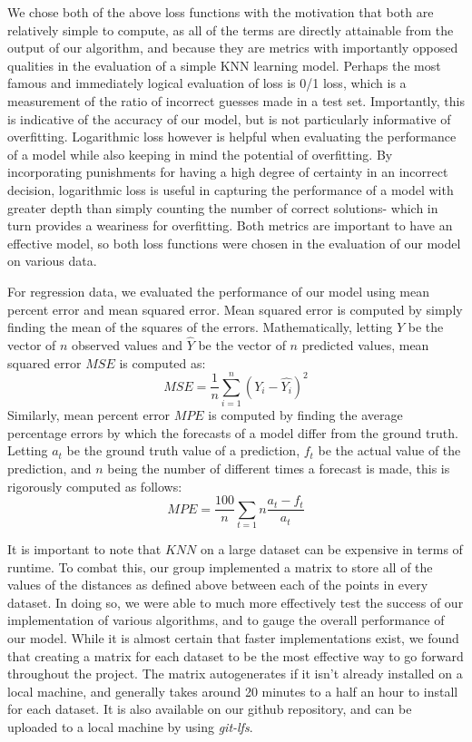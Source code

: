 \documentclass[twoside,11pt]{article}
\begin{document}
We chose both of the above loss functions with the motivation that both are relatively simple to compute, as all of the terms are directly attainable from the output of our algorithm, and
because they are metrics with importantly opposed qualities in the evaluation of a simple KNN learning model. Perhaps the most famous and immediately logical evaluation of loss is 0/1 loss, 
which is a measurement of the ratio of incorrect guesses made in a test set. Importantly, this is indicative of the accuracy of our model, but is not particularly informative of overfitting.
Logarithmic loss however is helpful when evaluating the performance of a model while also keeping in mind the potential of overfitting. By incorporating punishments for having a high degree
of certainty in an incorrect decision, logarithmic loss is useful in capturing the performance of a model with greater depth than simply counting the number of correct solutions- 
which in turn provides a weariness for overfitting.
Both metrics are important to have an effective model, so both loss functions were chosen in the evaluation of our model on various data.

For regression data, we evaluated the performance of our model using mean percent error and mean squared error. Mean squared error is computed by
simply finding the mean of the squares of the errors. Mathematically, letting $Y$ be the vector of $n$ observed values and $\hat{Y}$ be the vector of $n$ predicted
values, mean squared error $MSE$ is computed as:
\begin{equation}
MSE = \frac{1}{n} \sum_{i=1}^{n} (Y_i - \hat{Y_i})^2
\end{equation}
Similarly, mean percent error $MPE$ is computed by finding the average percentage errors by which the forecasts of a model differ from the ground truth. Letting $a_t$ be the 
ground truth value of a prediction, $f_t$ be the actual value of the prediction, and $n$ being the number of different times a forecast is made, this is rigorously
computed as follows:
\begin{equation}
MPE = \frac{100}{n} \sum_{t=1}{n} \frac{a_t - f_t}{a_t}
\end{equation}

It is important to note that $KNN$ on a large dataset can be expensive in terms of runtime. To combat this, our group implemented a matrix to store all of the values of the distances
as defined above between each of the points in every dataset. In doing so, we were able to much more effectively test the success of our implementation of various algorithms, and to
gauge the overall performance of our model. While it is almost certain that faster implementations exist, we found that creating a matrix for each dataset to be the most effective
way to go forward throughout the project. The matrix autogenerates if it isn't already installed on a local machine, and generally takes around 20 minutes to a half an hour to install
for each dataset. It is also available on our github repository, and can be uploaded to a local machine by using \textit{git-lfs}. 
\end{document}

